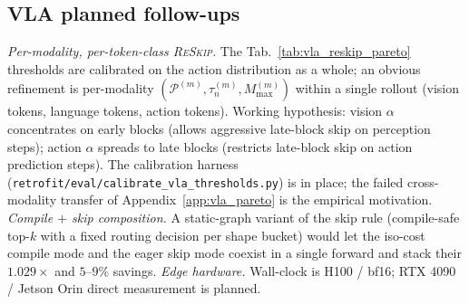 \documentclass{article}
\newcommand{\reskip}{\textsc{ReSkip}}
\begin{document}
\subsection{VLA planned follow-ups}
\label{app:vla_future}
\emph{Per-modality, per-token-class \reskip{}.} The Tab.~\ref{tab:vla_reskip_pareto} thresholds are calibrated on the action distribution as a whole; an obvious refinement is per-modality $(\mathcal{P}^{(m)}, \tau_n^{(m)}, M_{\max}^{(m)})$ within a single rollout (vision tokens, language tokens, action tokens). Working hypothesis: vision $\alpha$ concentrates on early blocks (allows aggressive late-block skip on perception steps); action $\alpha$ spreads to late blocks (restricts late-block skip on action prediction steps). The calibration harness (\texttt{retrofit/eval/calibrate\_vla\_thresholds.py}) is in place; the failed cross-modality transfer of Appendix~\ref{app:vla_pareto} is the empirical motivation. \emph{Compile $+$ skip composition.} A static-graph variant of the skip rule (compile-safe top-$k$ with a fixed routing decision per shape bucket) would let the iso-cost compile mode and the eager skip mode coexist in a single forward and stack their $1.029\times$ and $5$--$9\%$ savings. \emph{Edge hardware.} Wall-clock is H100 / bf16; RTX 4090 / Jetson Orin direct measurement is planned.
\end{document}
